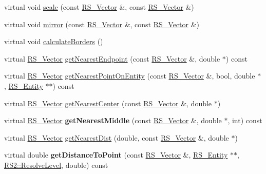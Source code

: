 \begin{DoxyCompactItemize}
\item 
virtual void \hyperlink{classRS__OverlayBox_a552f121fb6950e0f014b2fe96cc8fdf8}{scale} (const \hyperlink{classRS__Vector}{R\-S\-\_\-\-Vector} \&, const \hyperlink{classRS__Vector}{R\-S\-\_\-\-Vector} \&)
\item 
virtual void \hyperlink{classRS__OverlayBox_a8c21edee7fbc33c3954f96e1b120a4c3}{mirror} (const \hyperlink{classRS__Vector}{R\-S\-\_\-\-Vector} \&, const \hyperlink{classRS__Vector}{R\-S\-\_\-\-Vector} \&)
\item 
virtual void \hyperlink{classRS__OverlayBox_a0538bdfc2a834b39a5ea17b30ec78706}{calculate\-Borders} ()
\item 
virtual \hyperlink{classRS__Vector}{R\-S\-\_\-\-Vector} \hyperlink{classRS__OverlayBox_a6a17bf5ab2ee517f6909ec564094a384}{get\-Nearest\-Endpoint} (const \hyperlink{classRS__Vector}{R\-S\-\_\-\-Vector} \&, double $\ast$) const 
\item 
virtual \hyperlink{classRS__Vector}{R\-S\-\_\-\-Vector} \hyperlink{classRS__OverlayBox_aa53efc146262763081955d56e0c9ea54}{get\-Nearest\-Point\-On\-Entity} (const \hyperlink{classRS__Vector}{R\-S\-\_\-\-Vector} \&, bool, double $\ast$, \hyperlink{classRS__Entity}{R\-S\-\_\-\-Entity} $\ast$$\ast$) const 
\item 
virtual \hyperlink{classRS__Vector}{R\-S\-\_\-\-Vector} \hyperlink{classRS__OverlayBox_a302f6e87dda11fb51fe059466cab26e7}{get\-Nearest\-Center} (const \hyperlink{classRS__Vector}{R\-S\-\_\-\-Vector} \&, double $\ast$)
\item 
\hypertarget{classRS__OverlayBox_acf6243d8a602b83749a9f2ccd83b0d53}{virtual \hyperlink{classRS__Vector}{R\-S\-\_\-\-Vector} {\bfseries get\-Nearest\-Middle} (const \hyperlink{classRS__Vector}{R\-S\-\_\-\-Vector} \&, double $\ast$, int) const }\label{classRS__OverlayBox_acf6243d8a602b83749a9f2ccd83b0d53}

\item 
virtual \hyperlink{classRS__Vector}{R\-S\-\_\-\-Vector} \hyperlink{classRS__OverlayBox_adaa59ee4fc3fddc76340b91d3985dc4a}{get\-Nearest\-Dist} (double, const \hyperlink{classRS__Vector}{R\-S\-\_\-\-Vector} \&, double $\ast$)
\item 
\hypertarget{classRS__OverlayBox_aa633c55fc9fb71824abb112058b4f8ae}{virtual double {\bfseries get\-Distance\-To\-Point} (const \hyperlink{classRS__Vector}{R\-S\-\_\-\-Vector} \&, \hyperlink{classRS__Entity}{R\-S\-\_\-\-Entity} $\ast$$\ast$, \hyperlink{classRS2_a1b2c5e3a3e9d1b03a9564229255faa20}{R\-S2\-::\-Resolve\-Level}, double) const }\label{classRS__OverlayBox_aa633c55fc9fb71824abb112058b4f8ae}

\end{DoxyCompactItemize}
